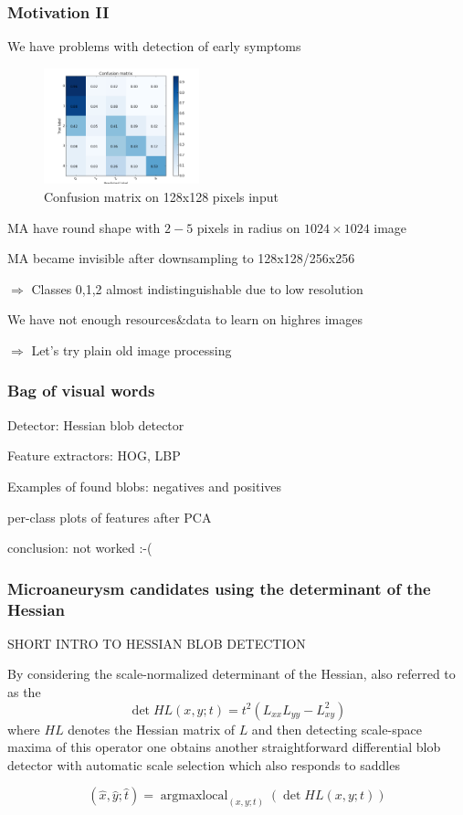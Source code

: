 \begin{frame}\frametitle{Motivation II}
\par We have problems with detection of early symptoms
\par
\begin{figure}
\begin{center}
\vspace{-10pt}
\includegraphics[width=0.4\textwidth]{pics/submission_21_inner_squares_conv5_maxout.png}
\caption{Confusion matrix on 128x128 pixels input}
\vspace{-15pt}
\end{center}
\end{figure}

\par MA have round shape with $2-5$ pixels in radius on $1024\times1024$ image 
\par MA became invisible after downsampling to 128x128/256x256
\par $\Rightarrow$ Classes 0,1,2 almost indistinguishable due to low resolution
\vspace{0.5cm}
\par We have not enough resources\&data to learn on highres images
\par $\Rightarrow$ Let's try plain old image processing

\end{frame}

\begin{frame}\frametitle{Bag of visual words}
\par Detector: Hessian blob detector
\par Feature extractors: HOG, LBP
\par Examples of found blobs: negatives and positives
\par per-class plots of features after PCA
\par conclusion: not worked :-(
\end{frame}

\begin{frame}\frametitle{Microaneurysm candidates using the determinant of the Hessian}
\par SHORT INTRO TO HESSIAN BLOB DETECTION

\par By considering the scale-normalized determinant of the Hessian, also referred to as the 
\[ \operatorname{det} HL(x, y; t) = t^2 (L_{xx} L_{yy} - L_{xy}^2) \]
where $HL$ denotes the Hessian matrix of $L$ and then detecting scale-space maxima of this operator one obtains another straightforward differential blob detector with automatic scale selection which also responds to saddles

\[(\hat{x}, \hat{y}; \hat{t}) = \operatorname{argmaxlocal}_{(x, y; t)}(\operatorname{det} H L(x, y; t))\]
\end{frame}

